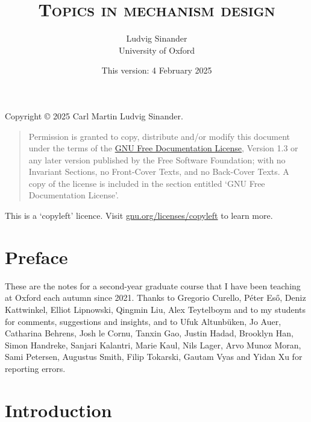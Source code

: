 \documentclass[11pt,letterpaper,reqno,oneside]{book}
\title{\scshape Topics in mechanism design}
\author{Ludvig Sinander \\
University of Oxford}
\date{\small This version: 4 February 2025}
\begin{document}
\maketitle

\pagebreak
\hspace{1pt}\vfill
\noindent
Copyright \copyright{} 2025 Carl Martin Ludvig Sinander.

\begin{quotation}
\noindent
Permission is granted to copy, distribute and/or modify this document under the terms of the \href{https://www.gnu.org/licenses/fdl}{GNU Free Documentation License}, Version 1.3 or any later version published by the Free Software Foundation; with no Invariant Sections, no Front-Cover Texts, and no Back-Cover Texts. A copy of the license is included in the section entitled `GNU
Free Documentation License'.
\end{quotation}

\noindent
This is a `copyleft' licence.
Visit \href{https://www.gnu.org/licenses/copyleft}{gnu.org/licenses/copyleft} to learn more.



\chapter*{Preface}
\label{preface}

These are the notes for a second-year graduate course that I have been teaching at Oxford each autumn since 2021.
Thanks to Gregorio Curello, Péter Es\H{o}, Deniz Kattwinkel, Elliot Lipnowski, Qingmin Liu, Alex Teytelboym and to my students for comments, suggestions and insights,
and to Ufuk Altunbüken, Jo Auer, Catharina Behrens, Josh le Cornu, Tanxin Gao, Justin Hadad, Brooklyn Han, Simon Handreke, Sanjari Kalantri, Marie Kaul, Nils Lager, Arvo Munoz Moran, Sami Petersen, Augustus Smith, Filip Tokarski, Gautam Vyas and Yidan Xu for reporting errors.



\pagebreak
{}
\setcounter{tocdepth}{1}
\tableofcontents
{}



\setcounter{chapter}{-1}
\chapter{Introduction}
\label{ch0}
\end{document}
